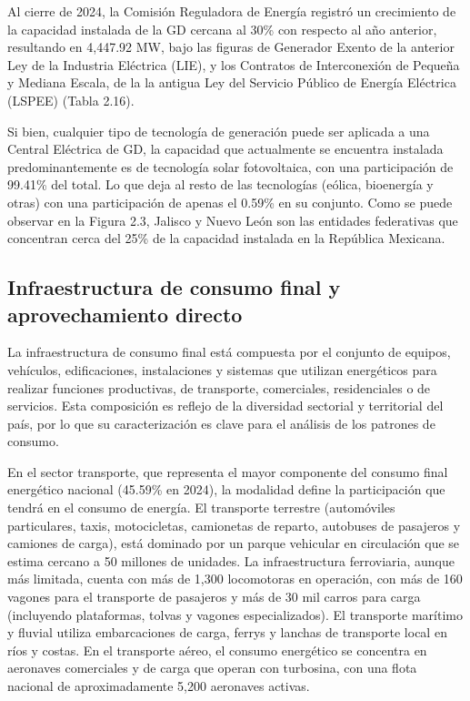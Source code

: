 \documentclass{sener2025}
\begin{document}
Al cierre de 2024, la Comisión Reguladora de Energía registró un crecimiento de la capacidad instalada de la GD cercana al 30\% con respecto al año anterior, resultando en 4,447.92 MW, bajo las figuras de Generador Exento de la anterior Ley de la Industria Eléctrica (LIE), y los Contratos de Interconexión de Pequeña y Mediana Escala, de la la antigua Ley del Servicio Público de Energía Eléctrica (LSPEE) (Tabla 2.16).

Si bien, cualquier tipo de tecnología de generación puede ser aplicada a una Central Eléctrica de GD, la capacidad que actualmente se encuentra instalada predominantemente es de tecnología solar fotovoltaica, con una participación de 99.41\% del total. Lo que deja al resto de las tecnologías (eólica, bioenergía y otras) con una participación de apenas el 0.59\% en su conjunto. Como se puede observar en la Figura 2.3, Jalisco y Nuevo León son las entidades federativas que concentran cerca del 25\% de la capacidad instalada en la República Mexicana.


\subsection{Infraestructura de consumo final y aprovechamiento directo}

La infraestructura de consumo final está compuesta por el conjunto de equipos, vehículos, edificaciones, instalaciones y sistemas que utilizan energéticos para realizar funciones productivas, de transporte, comerciales, residenciales o de servicios. Esta composición es reflejo de la diversidad sectorial y territorial del país, por lo que su caracterización es clave para el análisis de los patrones de consumo.

En el sector transporte, que representa el mayor componente del consumo final energético nacional (45.59\% en 2024), la modalidad define la participación que tendrá en el consumo de energía. El transporte terrestre (automóviles particulares, taxis, motocicletas, camionetas de reparto, autobuses de pasajeros y camiones de carga), está dominado por un parque vehicular en circulación que se estima cercano a 50 millones de unidades. La infraestructura ferroviaria, aunque más limitada, cuenta con más de 1,300 locomotoras en operación, con más de 160 vagones para el transporte de pasajeros y más de 30 mil carros para carga (incluyendo plataformas, tolvas y vagones especializados). El transporte marítimo y fluvial utiliza embarcaciones de carga, ferrys y lanchas de transporte local en ríos y costas. En el transporte aéreo, el consumo energético se concentra en aeronaves comerciales y de carga que operan con turbosina, con una flota nacional de aproximadamente 5,200 aeronaves activas.
\end{document}
